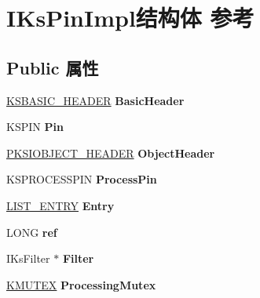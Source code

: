 \hypertarget{struct_i_ks_pin_impl}{}\section{I\+Ks\+Pin\+Impl结构体 参考}
\label{struct_i_ks_pin_impl}
\subsection*{Public 属性}
\begin{DoxyCompactItemize}
\item 
\mbox{\label{struct_i_ks_pin_impl_aac84faa86dcb5af6e27cff1d50c89554}} 
\hyperlink{struct_k_s_b_a_s_i_c___h_e_a_d_e_r}{K\+S\+B\+A\+S\+I\+C\+\_\+\+H\+E\+A\+D\+ER} {\bfseries Basic\+Header}
\item 
\mbox{\label{struct_i_ks_pin_impl_a47a702ebf0b4a9f90af77cc550424787}} 
K\+S\+P\+IN {\bfseries Pin}
\item 
\mbox{\label{struct_i_ks_pin_impl_a247d83cb8468bd1fb42aff9a02ce2533}} 
\hyperlink{struct_k_s_i_o_b_j_e_c_t___h_e_a_d_e_r}{P\+K\+S\+I\+O\+B\+J\+E\+C\+T\+\_\+\+H\+E\+A\+D\+ER} {\bfseries Object\+Header}
\item 
\mbox{\label{struct_i_ks_pin_impl_a113eff6a2bbca6baf5c7920b2f523d91}} 
K\+S\+P\+R\+O\+C\+E\+S\+S\+P\+IN {\bfseries Process\+Pin}
\item 
\mbox{\label{struct_i_ks_pin_impl_ad7d3d44a1eaa75dae83808f2a9624701}} 
\hyperlink{struct___l_i_s_t___e_n_t_r_y}{L\+I\+S\+T\+\_\+\+E\+N\+T\+RY} {\bfseries Entry}
\item 
\mbox{\label{struct_i_ks_pin_impl_a4cb1e6f7dc060b8b58f8682a879198af}} 
L\+O\+NG {\bfseries ref}
\item 
\mbox{\label{struct_i_ks_pin_impl_ae18d03fd4e6249965d493de73fae700e}} 
I\+Ks\+Filter $\ast$ {\bfseries Filter}
\item 
\mbox{\label{struct_i_ks_pin_impl_a41d40eadb4945b14691cf11ddb6ba93a}} 
\hyperlink{struct___k_m_u_t_a_n_t}{K\+M\+U\+T\+EX} {\bfseries Processing\+Mutex}

\end{DoxyCompactItemize}
